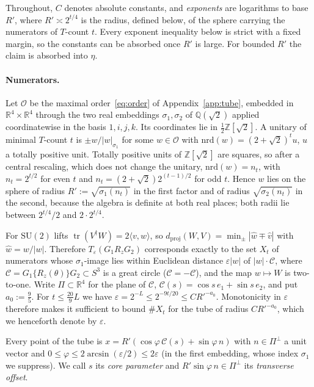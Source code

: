 \documentclass[aps,prx,twocolumn,superscriptaddress,nofootinbib,longbibliography]{revtex4-2}
\theoremstyle{plain}
\theoremstyle{definition}
\theoremstyle{remark}
\newcommand{\dproj}{d_{\mathrm{proj}}}
\newcommand{\Z}{\mathbb{Z}}
\newcommand{\Q}{\mathbb{Q}}
\newcommand{\R}{\mathbb{R}}
\newcommand{\tr}{\operatorname{tr}}
\begin{document}
Throughout, $C$ denotes absolute constants, and \emph{exponents} are logarithms to base $R'$, where $R'\asymp2^{t/4}$ is the radius, defined below, of the sphere carrying the numerators of $T$-count $t$. Every exponent inequality below is strict with a fixed margin, so the constants can be absorbed once $R'$ is large. For bounded $R'$ the claim is absorbed into $\eta$.

\paragraph{Numerators.} Let $\mathcal O$ be the maximal order~\eqref{eq:order} of Appendix~\ref{app:tube}, embedded in $\R^4\times\R^4$ through the two real embeddings $\sigma_1,\sigma_2$ of $\Q(\sqrt2)$ applied coordinatewise in the basis $1,i,j,k$. Its coordinates lie in $\tfrac12\Z[\sqrt2]$. A unitary of minimal $T$-count $t$ is $\pm w/|w|_{\sigma_1}$ for some $w\in\mathcal O$ with $\mathrm{nrd}(w)=(2+\sqrt2)^tu$, $u$ a totally positive unit. Totally positive units of $\Z[\sqrt2]$ are squares, so after a central rescaling, which does not change the unitary, $\mathrm{nrd}(w)=n_t$, with $n_t=2^{t/2}$ for even $t$ and $n_t=(2+\sqrt2)2^{(t-1)/2}$ for odd $t$. Hence $w$ lies on the sphere of radius $R':=\sqrt{\sigma_1(n_t)}$ in the first factor and of radius $\sqrt{\sigma_2(n_t)}$ in the second, because the algebra is definite at both real places; both radii lie between $2^{t/4}/2$ and $2\cdot2^{t/4}$. 

For $\mathrm{SU}(2)$ lifts $\tr(V^\dagger W)=2\langle v,w\rangle$, so $\dproj(W,V)=\min_\pm|\hat w\mp\hat v|$ with $\hat w=w/|w|$. Therefore $T_\varepsilon(G_1R_zG_2)$ corresponds exactly to the set $X_t$ of numerators whose $\sigma_1$-image lies within Euclidean distance $\varepsilon|w|$ of $|w|\cdot\mathcal C$, where $\mathcal C=G_1\{R_z(\theta)\}G_2\subset S^3$ is a great circle ($\mathcal C=-\mathcal C$), and the map $w\mapsto W$ is two-to-one. Write $\Pi\subset\R^4$ for the plane of $\mathcal C$, $\mathcal C(s)=\cos s\,e_1+\sin s\,e_2$, and put $a_0:=\tfrac95$. For $t\le\tfrac{20}9L$ we have $\varepsilon=2^{-L}\le2^{-9t/20}\le CR'^{-a_0}$. Monotonicity in $\varepsilon$ therefore makes it sufficient to bound $\#X_t$ for the tube of radius $CR'^{-a_0}$, which we henceforth denote by $\varepsilon$.

Every point of the tube is $x=R'(\cos\varphi\,\mathcal C(s)+\sin\varphi\,n)$ with $n\in\Pi^\perp$ a unit vector and $0\le\varphi\le2\arcsin(\varepsilon/2)\le2\varepsilon$ (in the first embedding, whose index $\sigma_1$ we suppress). We call $s$ its \emph{core parameter} and $R'\sin\varphi\,n\in\Pi^\perp$ its \emph{transverse offset}.
\end{document}
